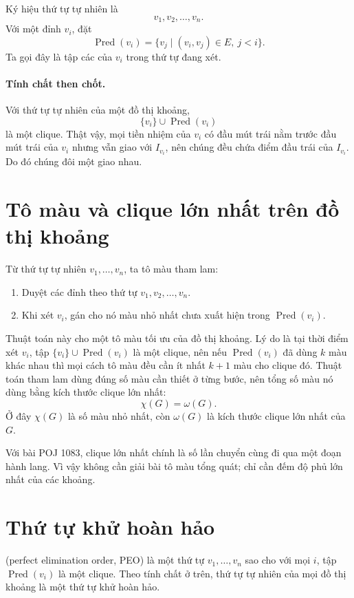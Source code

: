 \documentclass[11pt]{article}
\begin{document}
Ký hiệu thứ tự tự nhiên là
\[
  v_1,v_2,\ldots,v_n.
\]
Với một đỉnh $v_i$, đặt
\[
  \operatorname{Pred}(v_i)=
  \{v_j\mid (v_i,v_j)\in E,\ j<i\}.
\]
Ta gọi đây là tập các  của $v_i$ trong thứ tự đang xét.

\paragraph{Tính chất then chốt.}
Với thứ tự tự nhiên của một đồ thị khoảng,
\[
  \{v_i\}\cup \operatorname{Pred}(v_i)
\]
là một clique. Thật vậy, mọi tiền nhiệm của $v_i$ có đầu mút trái nằm trước
đầu mút trái của $v_i$ nhưng vẫn giao với $I_{v_i}$, nên chúng đều chứa điểm
đầu trái của $I_{v_i}$. Do đó chúng đôi một giao nhau.

\section{Tô màu và clique lớn nhất trên đồ thị khoảng}

Từ thứ tự tự nhiên $v_1,\ldots,v_n$, ta tô màu tham lam:
\begin{enumerate}
  \item Duyệt các đỉnh theo thứ tự $v_1,v_2,\ldots,v_n$.
  \item Khi xét $v_i$, gán cho nó màu nhỏ nhất chưa xuất hiện trong
  $\operatorname{Pred}(v_i)$.
\end{enumerate}

Thuật toán này cho một tô màu tối ưu của đồ thị khoảng. Lý do là tại thời điểm
xét $v_i$, tập $\{v_i\}\cup \operatorname{Pred}(v_i)$ là một clique, nên nếu
$\operatorname{Pred}(v_i)$ đã dùng $k$ màu khác nhau thì mọi cách tô màu đều
cần ít nhất $k+1$ màu cho clique đó. Thuật toán tham lam dùng đúng số màu cần
thiết ở từng bước, nên tổng số màu nó dùng bằng kích thước clique lớn nhất:
\[
  \chi(G)=\omega(G).
\]
Ở đây $\chi(G)$ là số màu nhỏ nhất, còn $\omega(G)$ là kích thước clique lớn
nhất của $G$.

Với bài POJ 1083, clique lớn nhất chính là số lần chuyển cùng đi qua một đoạn
hành lang. Vì vậy không cần giải bài tô màu tổng quát; chỉ cần đếm độ phủ lớn
nhất của các khoảng.

\section{Thứ tự khử hoàn hảo}

 (perfect elimination order, PEO) là một thứ tự
$v_1,\ldots,v_n$ sao cho với mọi $i$, tập $\operatorname{Pred}(v_i)$ là một
clique. Theo tính chất ở trên, thứ tự tự nhiên của mọi đồ thị khoảng là một
thứ tự khử hoàn hảo.
\end{document}

